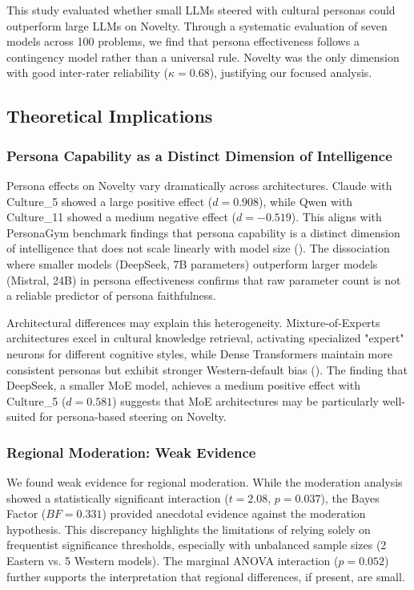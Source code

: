 \documentclass{article}
\begin{document}
This study evaluated whether small LLMs steered with cultural personas could outperform large LLMs on Novelty. Through a systematic evaluation of seven models across 100 problems, we find that persona effectiveness follows a contingency model rather than a universal rule. Novelty was the only dimension with good inter-rater reliability (\(\kappa = 0.68\)), justifying our focused analysis.

\subsection{Theoretical Implications}

\subsubsection{Persona Capability as a Distinct Dimension of Intelligence}

Persona effects on Novelty vary dramatically across architectures. Claude with Culture\_5 showed a large positive effect (\(d = 0.908\)), while Qwen with Culture\_11 showed a medium negative effect (\(d = -0.519\)). This aligns with PersonaGym benchmark findings that persona capability is a distinct dimension of intelligence that does not scale linearly with model size (\cite{samuel2024personagym}). The dissociation where smaller models (DeepSeek, 7B parameters) outperform larger models (Mistral, 24B) in persona effectiveness confirms that raw parameter count is not a reliable predictor of persona faithfulness.

Architectural differences may explain this heterogeneity. Mixture-of-Experts architectures excel in cultural knowledge retrieval, activating specialized "expert" neurons for different cognitive styles, while Dense Transformers maintain more consistent personas but exhibit stronger Western-default bias (\cite{reem_i__masoud_f9cde5f1, xinyu_zhang_c810e609}). The finding that DeepSeek, a smaller MoE model, achieves a medium positive effect with Culture\_5 (\(d = 0.581\)) suggests that MoE architectures may be particularly well-suited for persona-based steering on Novelty.

\subsubsection{Regional Moderation: Weak Evidence}

We found weak evidence for regional moderation. While the moderation analysis showed a statistically significant interaction (\(t = 2.08\), \(p = 0.037\)), the Bayes Factor (\(BF = 0.331\)) provided anecdotal evidence against the moderation hypothesis. This discrepancy highlights the limitations of relying solely on frequentist significance thresholds, especially with unbalanced sample sizes (2 Eastern vs. 5 Western models). The marginal ANOVA interaction (\(p = 0.052\)) further supports the interpretation that regional differences, if present, are small.
\end{document}
